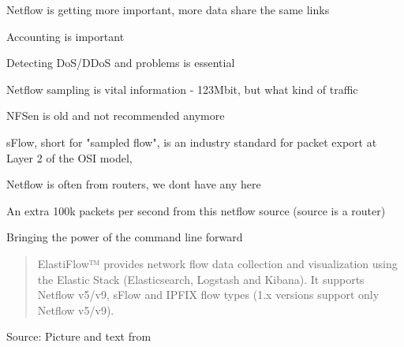 \documentclass[Screen16to9,17pt]{foils}
\begin{document}

\begin{list2}
\item Netflow is getting more important, more data share the same links
\item Accounting is important
\item Detecting DoS/DDoS and problems is essential
\item Netflow sampling is vital information - 123Mbit, but what kind of traffic
\item NFSen is old and not recommended anymore
\item sFlow, short for "sampled flow", is an industry standard for packet export at Layer 2 of the OSI model, \\
\end{list2}

\centerline{Netflow is often from routers, we dont have any here}








\centerline{An extra 100k packets per second from this netflow source (source is a router)}



\centerline{Bringing the power of the command line forward}



\begin{quote}
  ElastiFlow™ provides network flow data collection and visualization using the Elastic Stack (Elasticsearch, Logstash and Kibana). It supports Netflow v5/v9, sFlow and IPFIX flow types (1.x versions support only Netflow v5/v9).
\end{quote}
Source: Picture and text from  \\


\end{document}
